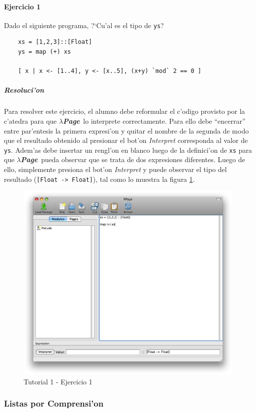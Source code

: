 \documentclass[a4paper]{article}
\newcommand{\hpage}{\textbf{\textsl{$\lambda$Page}}}
\begin{document}
\paragraph{Ejercicio 1}Dado el siguiente programa, ?`Cu'al es el tipo de \texttt{ys}?
\lstset{language=haskell, frame=single, tabsize=4}
\begin{center}\begin{lstlisting}
	xs = [1,2,3]::[Float]
	ys = map (+) xs
	
	[ x | x <- [1..4], y <- [x..5], (x+y) `mod` 2 == 0 ]
\end{lstlisting}\end{center}
\subparagraph{Resoluci'on}Para resolver este ejercicio, el alumno debe reformular el c'odigo provisto por la c'atedra para que \hpage\ lo interprete correctamente.  Para ello debe ``encerrar'' entre par'entesis la primera expresi'on y quitar el nombre de la segunda de modo que el resultado obtenido al presionar el bot'on \textsl{Interpret} corresponda al valor de \texttt{ys}.  Adem'as debe insertar un rengl'on en blanco luego de la definici'on de \texttt{xs} para que \hpage\ pueda observar que se trata de dos expresiones diferentes.  Luego de ello, simplemente presiona el bot'on \textsl{Interpret} y puede observar el tipo del resultado (\texttt{[Float -> Float]}), tal como lo muestra la figura \ref{tut101}.
\begin{figure}[hp]
	\begin{center}
        	\includegraphics[width=.75\textwidth]{pictures/tut1/01}
		\caption{Tutorial 1 - Ejercicio 1}
		\label{tut101}
	\end{center}
\end{figure}

\newpage
\subsubsection{Listas por Comprensi'on}
\end{document}
